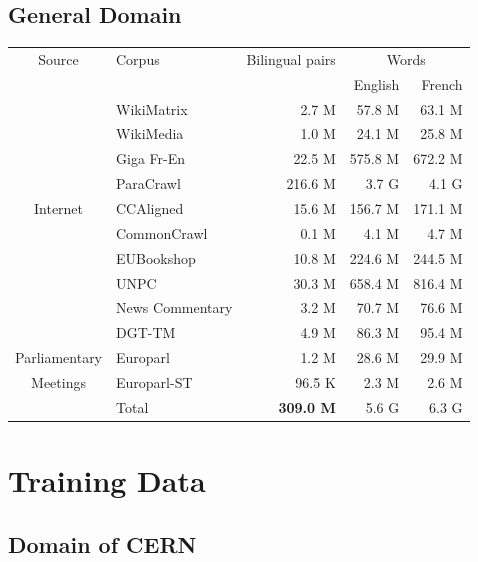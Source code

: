 \documentclass[landscape]{article}
\begin{document}
\subsection*{General Domain}
\vspace*{5mm}
\begin{table}[!ht]
\centering
\begin{tabular}{c|l||r|r|r} 
Source&Corpus						&		Bilingual pairs		&		\multicolumn{2}{c}{Words}		\\	
		&					&									&		English			&			French			\\	\hline	
&WikiMatrix				&		2.7 M					&		57.8 M			&			63.1 M			\\ 
&WikiMedia				&		1.0 M					&		24.1 M			&			25.8 M			\\ 
&Giga	Fr-En					&		22.5 M					&		575.8 M		&			672.2 M		\\ 
&ParaCrawl					&		216.6 M				&		3.7 G				&			4.1 G				\\ 
Internet&CCAligned					&		15.6 M					&		156.7 M		&			171.1 M		\\ 
&CommonCrawl			&		0.1 M					&		4.1 M			&			4.7 M		 	\\
&EUBookshop 			&		10.8 M					&		224.6 M		&			244.5 M		\\  
&UNPC						&		30.3 M					&		658.4 M		&			816.4 M		\\ 
&News Commentary 	&		3.2 M					&		70.7 M			&			76.6 M			\\ \hline 
&DGT-TM					&		4.9 M					&		86.3 M			&			95.4 M			\\ 
Parliamentary&Europarl					&		1.2 M					&		28.6 M			&			29.9 M			\\ 
Meetings&Europarl-ST 				&		96.5 K 					&		2.3 M			&			2.6 M 			\\ \hline
&Total							&		\textbf{309.0 M}				&		5.6 G				&			6.3 G				\\ 
\end{tabular}
\end{table}


\cp
\section*{Training Data}
\vspace*{10mm}
\subsection*{Domain of CERN}
\vspace*{5mm}
\end{document}
